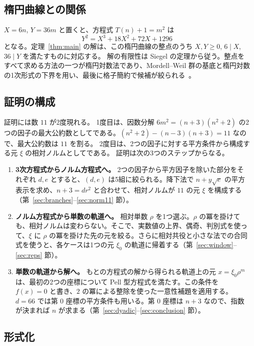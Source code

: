 \documentclass[a4paper,11pt]{ltjsarticle}
\theoremstyle{jplain}
\numberwithin{equation}{section}
\numberwithin{table}{section}
\begin{document}
\subsection{楕円曲線との関係}

$X=6n$, $Y=36m$ と置くと、方程式 $T(n)+1=m^2$ は
\[
Y^2=X^3+18X^2+72X+1296
\]
となる。定理~\ref{thm:main} の解は、この楕円曲線の整点のうち $X,Y\ge0$, $6\mid X$, $36\mid Y$ を満たすものに対応する。
解の有限性は Siegel の定理から従う。整点をすべて求める方法の一つが楕円対数法であり、Mordell--Weil 群の基底と楕円対数の1次形式の下界を用い、最後に格子簡約で候補が絞られる~\cite{ST94,GPZ94}。

\subsection{証明の構成}

証明には数 $11$ が2度現れる。
1度目は、因数分解 $6m^2=(n+3)(n^2+2)$ の2つの因子の最大公約数としてである。$(n^2+2)-(n-3)(n+3)=11$ なので、最大公約数は $11$ を割る。
2度目は、2つの因子に対する平方条件から構成する元 $\xi$ の相対ノルムとしてである。
証明は次の3つのステップからなる。

\begin{enumerate}
\item \textbf{3次方程式からノルム方程式へ。}
2つの因子から平方因子を除いた部分をそれぞれ $d,e$ とすると、$(d,e)$ は5組に絞られる。降下法で $n+y\sqrt e$ の平方表示を求め、$n+3=dr^2$ と合わせて、相対ノルムが $11$ の元 $\xi$ を構成する（第~\ref{sec:branches}--\ref{sec:norm11} 節）。
\item \textbf{ノルム方程式から単数の軌道へ。}
相対単数 $\rho$ を1つ選ぶ。$\rho$ の冪を掛けても、相対ノルムは変わらない。そこで、実数値の上界、偶奇、判別式を使って、$\xi$ に $\rho$ の冪を掛けた先の元を絞る。さらに相対共役と小さな法での合同式を使うと、各ケースは1つの元 $\xi_0$ の軌道に帰着する（第~\ref{sec:window}--\ref{sec:reps} 節）。
\item \textbf{単数の軌道から解へ。}
もとの方程式の解から得られる軌道上の元 $x=\xi_0\rho^m$ は、最初の2つの座標について Pell 型方程式を満たす。この条件を $f(x)=0$ と書き、$2$ の冪による整除を使った一意性補題を適用する。$d=66$ では第 $0$ 座標の平方条件も用いる。第 $0$ 座標は $n+3$ なので、指数が決まれば $n$ が求まる（第~\ref{sec:dyadic}--\ref{sec:conclusion} 節）。
\end{enumerate}

\subsection{形式化}
\end{document}
